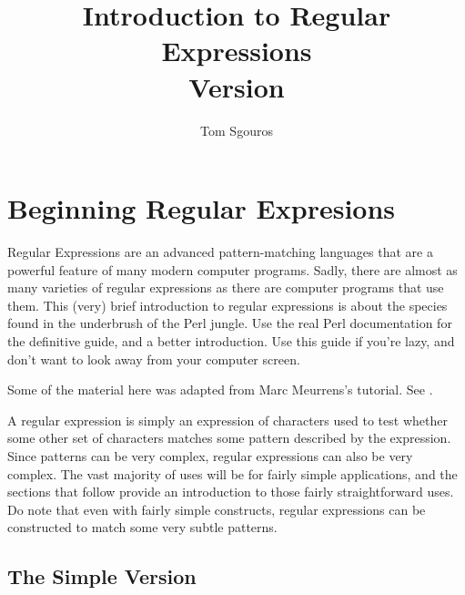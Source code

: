 \documentclass{dods-book}
\newcommand{\DOCversion}{Version \rcsInfoRevision}
\begin{document}
\title{Introduction to Regular Expressions\\\DOCversion}
\author{Tom Sgouros}
\date{\rcsInfoDate}
\maketitle


\W{}

\tableofcontents

\clearemptydoublepage

\T\chapter{Beginning Regular Expresions}

Regular Expressions are an advanced pattern-matching languages that
are a powerful feature of many modern computer programs.  Sadly, there
are almost as many varieties of regular expressions as there are
computer programs that use them.  This (very) brief introduction to
regular expressions is about the species found in the underbrush of
the Perl jungle.  Use the real Perl documentation for the definitive
guide, and a better introduction.  Use this guide if you're lazy, and
don't want to look away from your computer screen.

Some of the material here was adapted from Marc Meurrens's tutorial.
See .


A regular expression is simply an expression of characters used to test
whether some other set of characters matches some pattern described by
the expression.  Since patterns can be very complex, regular
expressions can also be very complex.  The vast majority of uses will
be for fairly simple applications, and the sections that follow
provide an introduction to those fairly straightforward uses.  Do note
that even with fairly simple constructs, regular expressions can be
constructed to match some very subtle patterns.

\section{The Simple Version}
\end{document}
